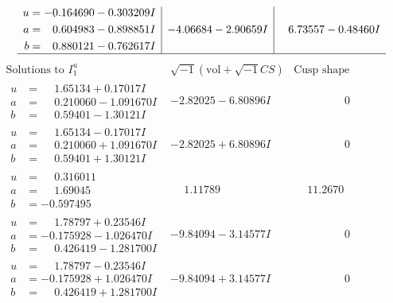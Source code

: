 \documentclass[1p]{elsarticle_modified}
\theoremstyle{definition}
\newcommand{\I}{\sqrt{-1}}
\begin{document}
$$\begin{array}{c|c|c}
\begin{aligned}
u &= -0.164690 - 0.303209 I \\
a &= \phantom{-}0.604983 - 0.898851 I \\
b &= \phantom{-}0.880121 - 0.762617 I\end{aligned}
 & -4.06684 - 2.90659 I & \phantom{-}6.73557 - 0.48460 I\\
 \hline 
 \end{array}$$\newpage$$\begin{array}{c|c|c}  
\text{Solutions to }I^u_{1}& \I (\text{vol} + \sqrt{-1}CS) & \text{Cusp shape}\\
 \hline 
\begin{aligned}
u &= \phantom{-}1.65134 + 0.17017 I \\
a &= \phantom{-}0.210060 - 1.091670 I \\
b &= \phantom{-}0.59401 - 1.30121 I\end{aligned}
 & -2.82025 - 6.80896 I & \phantom{-0.000000 } 0 \\ \hline\begin{aligned}
u &= \phantom{-}1.65134 - 0.17017 I \\
a &= \phantom{-}0.210060 + 1.091670 I \\
b &= \phantom{-}0.59401 + 1.30121 I\end{aligned}
 & -2.82025 + 6.80896 I & \phantom{-0.000000 } 0 \\ \hline\begin{aligned}
u &= \phantom{-}0.316011\phantom{ +0.000000I} \\
a &= \phantom{-}1.69045\phantom{ +0.000000I} \\
b &= -0.597495\phantom{ +0.000000I}\end{aligned}
 & \phantom{-}1.11789\phantom{ +0.000000I} & \phantom{-}11.2670\phantom{ +0.000000I} \\ \hline\begin{aligned}
u &= \phantom{-}1.78797 + 0.23546 I \\
a &= -0.175928 - 1.026470 I \\
b &= \phantom{-}0.426419 - 1.281700 I\end{aligned}
 & -9.84094 - 3.14577 I & \phantom{-0.000000 } 0 \\ \hline\begin{aligned}
u &= \phantom{-}1.78797 - 0.23546 I \\
a &= -0.175928 + 1.026470 I \\
b &= \phantom{-}0.426419 + 1.281700 I\end{aligned}
 & -9.84094 + 3.14577 I & \phantom{-0.000000 } 0 \\ \hline\begin{aligned}

\end{aligned}
\end{array}$$
\end{document}
